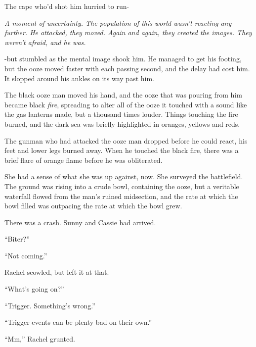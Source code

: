 The cape who'd shot him hurried to run-



\emph{A moment of uncertainty.  The population of this world wasn't reacting any further.  He attacked, they moved.  Again and again, they created the images.  They weren't afraid, and he was.}



-but stumbled as the mental image shook him.  He managed to get his footing, but the ooze moved faster with each passing second, and the delay had cost him.  It slopped around his ankles on its way past him.



The black ooze man moved his hand, and the ooze that was pouring from him became black \emph{fire}, spreading to alter all of the ooze it touched with a sound like the gas lanterns made, but a thousand times louder.  Things touching the fire burned, and the dark sea was briefly highlighted in oranges, yellows and reds.



The gunman who had attacked the ooze man dropped before he could react, his feet and lower legs burned away.  When he touched the black fire, there was a brief flare of orange flame before he was obliterated.



She had a sense of what she was up against, now.  She surveyed the battlefield.  The ground was rising into a crude bowl, containing the ooze, but a veritable waterfall flowed from the man's ruined midsection, and the rate at which the bowl filled was outpacing the rate at which the bowl grew.



There was a crash.  Sunny and Cassie had arrived.



``Biter?''



``Not coming.''



Rachel scowled, but left it at that.



``What's going on?''



``Trigger.  Something's wrong.''



``Trigger events can be plenty bad on their own.''



``Mm,'' Rachel grunted.



